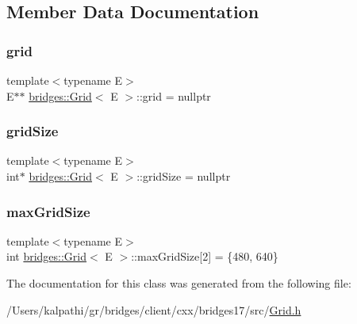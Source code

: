 \subsection{Member Data Documentation}
\mbox{\label{classbridges_1_1_grid_aea6c38498d477f09dc03906ee6fb6e19}} 
\subsubsection{\texorpdfstring{grid}{grid}}
{\footnotesize\ttfamily template$<$typename E$>$ \\
E$\ast$$\ast$ \mbox{\hyperlink{classbridges_1_1_grid}{bridges\+::\+Grid}}$<$ E $>$\+::grid = nullptr\hspace{0.3cm}{\ttfamily [protected]}}

\mbox{\label{classbridges_1_1_grid_ae87f0cf8ad2ea108f65561901f396d5c}} 
\subsubsection{\texorpdfstring{grid\+Size}{gridSize}}
{\footnotesize\ttfamily template$<$typename E$>$ \\
int$\ast$ \mbox{\hyperlink{classbridges_1_1_grid}{bridges\+::\+Grid}}$<$ E $>$\+::grid\+Size = nullptr\hspace{0.3cm}{\ttfamily [protected]}}

\mbox{\label{classbridges_1_1_grid_a800909a94e0affac82da79cf3e6d03e5}} 
\subsubsection{\texorpdfstring{max\+Grid\+Size}{maxGridSize}}
{\footnotesize\ttfamily template$<$typename E$>$ \\
int \mbox{\hyperlink{classbridges_1_1_grid}{bridges\+::\+Grid}}$<$ E $>$\+::max\+Grid\+Size\mbox{[}2\mbox{]} = \{480, 640\}\hspace{0.3cm}{\ttfamily [protected]}}



The documentation for this class was generated from the following file\+:\begin{DoxyCompactItemize}
\item 
/\+Users/kalpathi/gr/bridges/client/cxx/bridges17/src/\mbox{\hyperlink{_grid_8h}{Grid.\+h}}\end{DoxyCompactItemize}
